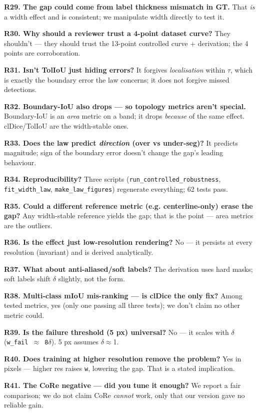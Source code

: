 \documentclass[11pt]{article}
\begin{document}
\textbf{R29. The gap could come from label thickness mismatch in GT.} That \textit{is} a width effect and is consistent; we manipulate width directly to test it.

\textbf{R30. Why should a reviewer trust a 4-point dataset curve?} They shouldn't --- they should trust the 13-point controlled curve + derivation; the 4 points are corroboration.

\textbf{R31. Isn't TolIoU just hiding errors?} It forgives \textit{localisation} within $\tau$, which is exactly the boundary error the law concerns; it does not forgive missed detections.

\textbf{R32. Boundary-IoU also drops --- so topology metrics aren't special.} Boundary-IoU is an \textit{area} metric on a band; it drops \textit{because} of the same effect. clDice/TolIoU are the width-stable ones.

\textbf{R33. Does the law predict \textit{direction} (over vs under-seg)?} It predicts magnitude; sign of the boundary error doesn't change the gap's leading behaviour.

\textbf{R34. Reproducibility?} Three scripts (\texttt{run\_controlled\_robustness}, \texttt{fit\_width\_law}, \texttt{make\_law\_figures}) regenerate everything; 62 tests pass.

\textbf{R35. Could a different reference metric (e.g. centerline-only) erase the gap?} Any width-stable reference yields the gap; that is the point --- area metrics are the outliers.

\textbf{R36. Is the effect just low-resolution rendering?} No --- it persists at every resolution (invariant) and is derived analytically.

\textbf{R37. What about anti-aliased/soft labels?} The derivation uses hard masks; soft labels shift \texttt{$\delta$} slightly, not the form.

\textbf{R38. Multi-class mIoU mis-ranking --- is clDice the only fix?} Among tested metrics, yes (only one passing all three tests); we don't claim no other metric could.

\textbf{R39. Is the failure threshold (5 px) universal?} No --- it scales with $\delta$ (\texttt{w\_fail $\approx$ 8$\delta$}). 5 px assumes $\delta$$\approx$1.

\textbf{R40. Does training at higher resolution remove the problem?} Yes in pixels --- higher res raises \texttt{w}, lowering the gap. That is a stated implication.

\textbf{R41. The CoRe negative --- did you tune it enough?} We report a fair comparison; we do not claim CoRe \textit{cannot} work, only that our version gave no reliable gain.
\end{document}

